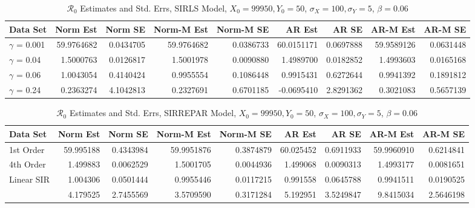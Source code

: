 \documentclass[12pt]{article}
\newcommand{\rr}{\ensuremath{\mathcal{R}_0}}
\begin{document}
\begin{table}[H]
	
	\caption{\label{tab:}$\rr$ Estimates and Std. Errs, SIRLS Model,
		$X_0 = 99950, Y_0 = 50$, $\sigma_X = 100, \sigma_Y = 5$, $\beta = 0.06$}
	\centering
	\begin{footnotesize}
	\begin{tabular}[t]{l|r|r|r|r|r|r|r|r}
		\hline
		Data Set & Norm Est & Norm SE & Norm-M Est & Norm-M SE & AR Est & AR SE & AR-M Est & AR-M SE\\
		\hline
		$\gamma$ = 0.001 & 59.9764682 & 0.0434705 & 59.9764682 & 0.0386733 & 60.0151171 & 0.0697888 & 59.9589126 & 0.0631448\\
		\hline
		$\gamma$ = 0.04 & 1.5000763 & 0.0126817 & 1.5001978 & 0.0090880 & 1.4989700 & 0.0182852 & 1.4993603 & 0.0165168\\
		\hline
		$\gamma$ = 0.06 & 1.0043054 & 0.4140424 & 0.9955554 & 0.1086448 & 0.9915431 & 0.6272644 & 0.9941392 & 0.1891812\\
		\hline
		$\gamma$ = 0.24 & 0.2363274 & 4.1042813 & 0.2327691 & 0.6701185 & -0.0695410 & 2.8291362 & 0.3021083 & 0.5657139\\
		\hline
	\end{tabular}
\end{footnotesize}
\end{table}
\begin{table}[H]
	
	\caption{\label{tab:}$\rr$ Estimates and Std. Errs, SIRREPAR Model,
		$X_0 = 99950, Y_0 = 50$, $\sigma_X = 100, \sigma_Y = 5$, $\beta = 0.06$}
	\centering
	\begin{footnotesize}
	\begin{tabular}[t]{l|r|r|r|r|r|r|r|r}
		\hline
		Data Set & Norm Est & Norm SE & Norm-M Est & Norm-M SE & AR Est & AR SE & AR-M Est & AR-M SE\\
		\hline
		1st Order & 59.995188 & 0.4343984 & 59.9951876 & 0.3874879 & 60.025452 & 0.6911933 & 59.9960910 & 0.6214841\\
		\hline
		4th Order & 1.499883 & 0.0062529 & 1.5001705 & 0.0044936 & 1.499068 & 0.0090313 & 1.4993177 & 0.0081651\\
		\hline
		Linear SIR & 1.004306 & 0.0501444 & 0.9955446 & 0.0117215 & 0.991558 & 0.0645788 & 0.9941511 & 0.0190525\\
		\hline
		& 4.179525 & 2.7455569 & 3.5709590 & 0.3171284 & 5.192951 & 3.5249847 & 9.8415034 & 2.5646198\\
		\hline
	\end{tabular}
\end{footnotesize}
\end{table}
\end{document}
